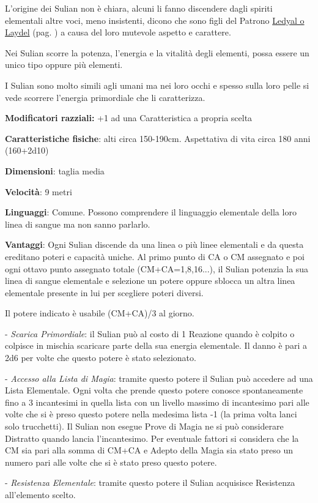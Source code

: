 \begin{multicols}{2}
L'origine dei Sulian non è chiara, alcuni li fanno discendere dagli spiriti elementali altre voci, meno insistenti, dicono che sono figli del Patrono \hyperlink{ledyal}{Ledyal o Laydel} (pag. \pageref{ledyal}) a causa del loro mutevole aspetto e carattere.

Nei Sulian scorre la potenza, l'energia e la vitalità degli elementi, possa essere un unico tipo oppure più elementi.

I Sulian sono molto simili agli umani ma nei loro occhi e spesso sulla loro pelle si vede scorrere l'energia primordiale che li caratterizza.

\textbf{Modificatori razziali:} +1 ad una Caratteristica a propria scelta

\textbf{Caratteristiche fisiche}: alti circa 150-190cm. Aspettativa di vita circa 180 anni (160+2d10)

\textbf{Dimensioni}: taglia media

\textbf{Velocità}: 9 metri

\textbf{Linguaggi}: Comune. Possono comprendere il linguaggio elementale della loro linea di sangue ma non sanno parlarlo.

\textbf{Vantaggi}: Ogni Sulian discende da una linea o più linee elementali e da questa ereditano poteri e capacità uniche. Al primo punto di CA o CM assegnato e poi ogni ottavo punto assegnato totale (CM+CA=1,8,16...), il Sulian potenzia la sua linea di sangue elementale e selezione un potere oppure sblocca un altra linea elementale presente in lui per scegliere poteri diversi.

Il potere indicato è usabile (CM+CA)/3 al giorno.

- \emph{Scarica Primordiale}: il Sulian può al costo di 1 Reazione quando è colpito o colpisce in mischia scaricare parte della sua energia elementale. Il danno è pari a 2d6 per volte che questo potere è stato selezionato.

- \emph{Accesso alla Lista di Magia}: tramite questo potere il Sulian può accedere ad una Lista Elementale. Ogni volta che prende questo potere conosce spontaneamente fino a 3 incantesimi in quella lista con un livello massimo di incantesimo pari alle volte che si è preso questo potere nella medesima lista -1 (la prima volta lanci solo trucchetti).
Il Sulian non esegue Prove di Magia ne si può considerare Distratto quando lancia l'incantesimo. Per eventuale fattori si considera che la CM sia pari alla somma di CM+CA e Adepto della Magia sia stato preso un numero pari alle volte che si è stato preso questo potere.

- \emph{Resistenza Elementale}: tramite questo potere il Sulian acquisisce Resistenza all'elemento scelto.

\end{multicols}

